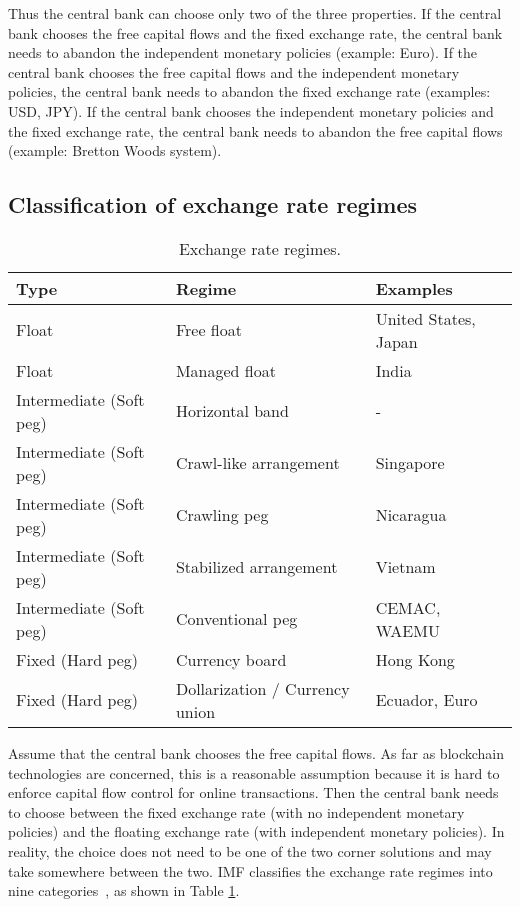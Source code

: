 \documentclass[dvipdfmx,a4paper]{article}
\begin{document}
Thus the central bank can choose only two of the three properties. If the central bank chooses the free capital flows and the fixed exchange rate, the central bank needs to abandon the independent monetary policies (example: Euro). If the central bank chooses the free capital flows and the independent monetary policies, the central bank needs to abandon the fixed exchange rate (examples: USD, JPY). If the central bank chooses the independent monetary policies and the fixed exchange rate, the central bank needs to abandon the free capital flows (example: Bretton Woods system).

\subsection{Classification of exchange rate regimes}

\begin{table}[tb]
\begin{center}
\caption{Exchange rate regimes.}\vspace{2ex}
\begin{tabular}{lll}\hline
  Type & Regime & Examples\\\hline
  Float & Free float & United States, Japan\\
  Float & Managed float & India\\
  Intermediate (Soft peg) & Horizontal band & -\\
  Intermediate (Soft peg) & Crawl-like arrangement & Singapore\\
  Intermediate (Soft peg) & Crawling peg & Nicaragua\\
  Intermediate (Soft peg) & Stabilized arrangement & Vietnam\\
  Intermediate (Soft peg) & Conventional peg & CEMAC, WAEMU\\
  Fixed (Hard peg) & Currency board & Hong Kong\\
  Fixed (Hard peg) & Dollarization / Currency union & Ecuador, Euro\\\hline
\end{tabular}
\label{exchange_rate_regimes}
\end{center}
\end{table}

Assume that the central bank chooses the free capital flows. As far as blockchain technologies are concerned, this is a reasonable assumption because it is hard to enforce capital flow control for online transactions. Then the central bank needs to choose between the fixed exchange rate (with no independent monetary policies) and the floating exchange rate (with independent monetary policies). In reality, the choice does not need to be one of the two corner solutions and may take somewhere between the two. IMF classifies the exchange rate regimes into nine categories~\cite{imfreport}, as shown in Table \ref{exchange_rate_regimes}.
\end{document}
